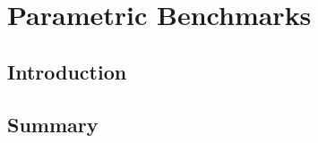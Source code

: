 \chapter{Parametric Benchmarks} \label{chp:parametric}
\section{Introduction} \label{sec:parametric/introduction}

\section{Summary} \label{sec:parametric/summary}